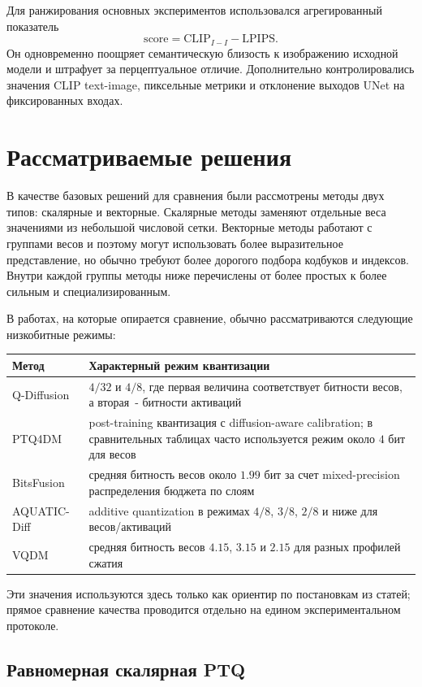 \documentclass[a4paper,12pt]{article}
\begin{document}
Для ранжирования основных экспериментов использовался агрегированный показатель
\[
    \mathrm{score} = \mathrm{CLIP}_{I-I} - \mathrm{LPIPS}.
\]
Он одновременно поощряет семантическую близость к изображению исходной модели и штрафует за перцептуальное отличие. Дополнительно контролировались значения CLIP text-image, пиксельные метрики и отклонение выходов UNet на фиксированных входах.

\section{Рассматриваемые решения}

В качестве базовых решений для сравнения были рассмотрены методы двух типов: скалярные и векторные. Скалярные методы заменяют отдельные веса значениями из небольшой числовой сетки. Векторные методы работают с группами весов и поэтому могут использовать более выразительное представление, но обычно требуют более дорогого подбора кодбуков и индексов. Внутри каждой группы методы ниже перечислены от более простых к более сильным и специализированным.

В работах, на которые опирается сравнение, обычно рассматриваются следующие низкобитные режимы:
\begin{center}
\small
\begin{tabular}{p{}p{}}
\hline
Метод & Характерный режим квантизации \\
\hline
Q-Diffusion & $4/32$ и $4/8$, где первая величина соответствует битности весов, а вторая~- битности активаций \\
PTQ4DM & post-training квантизация с diffusion-aware calibration; в сравнительных таблицах часто используется режим около $4$ бит для весов \\
BitsFusion & средняя битность весов около $1.99$ бит за счет mixed-precision распределения бюджета по слоям \\
AQUATIC-Diff & additive quantization в режимах $4/8$, $3/8$, $2/8$ и ниже для весов/активаций \\
VQDM & средняя битность весов $4.15$, $3.15$ и $2.15$ для разных профилей сжатия \\
\hline
\end{tabular}
\end{center}
Эти значения используются здесь только как ориентир по постановкам из статей; прямое сравнение качества проводится отдельно на едином экспериментальном протоколе.

\subsection{Равномерная скалярная PTQ}
\end{document}

